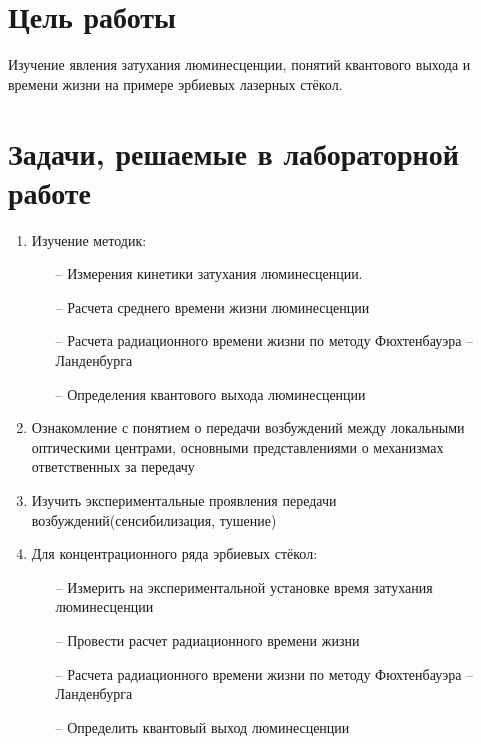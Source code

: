 
\section{Цель работы}\label{sec:purpose}


Изучение явления затухания люминесценции, понятий квантового выхода и времени жизни на примере эрбиевых лазерных стёкол.

\section{Задачи, решаемые в лабораторной работе}\label{sec:tasks}
\begin{enumerate}
	\item Изучение методик:
		\begin{itemize}
			\item[--] Измерения кинетики затухания люминесценции.
			\item[--] Расчета среднего времени жизни люминесценции
			\item[--] Расчета радиационного времени жизни по методу Фюхтенбауэра – Ланденбурга
			\item[--] Определения квантового выхода люминесценции
		\end{itemize}
	\item Ознакомление с понятием о передачи возбуждений между локальными
			оптическими центрами, основными представлениями о механизмах
			ответственных за передачу
	\item Изучить экспериментальные проявления передачи возбуждений(сенсибилизация, тушение)
	\item Для концентрационного ряда эрбиевых стёкол:
		\begin{itemize}
			\item[--] Измерить на экспериментальной установке время затухания люминесценции
			\item[--] Провести расчет радиационного времени жизни
			\item[--] Расчета радиационного времени жизни по методу Фюхтенбауэра – Ланденбурга
			\item[--] Определить квантовый выход люминесценции
		\end{itemize}
\end{enumerate}

